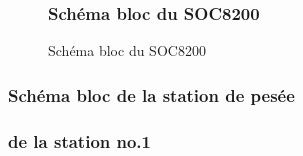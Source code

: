 \documentclass[10pt,a4paper,final]{article}
\begin{document}
\begin{spacing}{1.5}
\begin{figure}[hbtp]
\subsubsection{Schéma bloc du SOC8200}
\caption{Schéma bloc du SOC8200}
\centering
{}
\end{figure}

\vfill
\pagebreak

\subsubsection{Schéma bloc de la station de pesée}

\vfill
\pagebreak

\subsubsection{de la station no.1}


\end{spacing}
\end{document}
